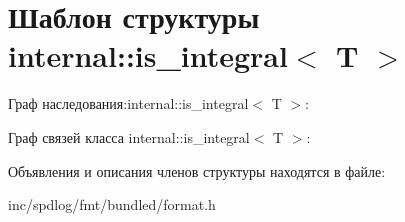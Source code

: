 \hypertarget{structinternal_1_1is__integral}{}\section{Шаблон структуры internal\+:\+:is\+\_\+integral$<$ T $>$}
\label{structinternal_1_1is__integral}


Граф наследования\+:internal\+:\+:is\+\_\+integral$<$ T $>$\+:


Граф связей класса internal\+:\+:is\+\_\+integral$<$ T $>$\+:


Объявления и описания членов структуры находятся в файле\+:\begin{DoxyCompactItemize}
\item 
inc/spdlog/fmt/bundled/format.\+h\end{DoxyCompactItemize}
